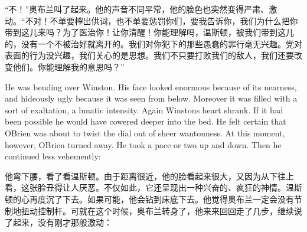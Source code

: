 \begin{paracol}{2}
\switchcolumn

``不！''奥布兰叫了起来。他的声音不同平常，他的脸色也突然变得严肃、激动。``不对！不单要榨出供词，也不单要惩罚你们，要我告诉你，我们为什么把你带到这儿来吗？为了医治你！让你清醒！你能理解吗，温斯顿，被我们带到这儿的，没有一个不被治好就离开的。我们对你犯下的那些愚蠢的罪行毫无兴趣。党对表面的行为没兴趣，我们关心的是思想。我们不只要打败我们的敌人，我们还要改变他们。你能理解我的意思吗？''

\switchcolumn*

He was bending over Winston. His face looked enormous because of its
nearness, and hideously ugly because it was seen from below. Moreover it
was filled with a sort of exaltation, a lunatic intensity. Again
Winston\textquotesingle s heart shrank. If it had been possible he would
have cowered deeper into the bed. He felt certain that
O\textquotesingle Brien was about to twist the dial out of sheer
wantonness. At this moment, however, O\textquotesingle Brien turned
away. He took a pace or two up and down. Then he continued less
vehemently:

\switchcolumn

他弯下腰，看了看温斯顿。由于距离很近，他的脸看起来很大，又因为从下往上看，这张脸丑得让人厌恶。不仅如此，它还呈现出一种兴奋的、疯狂的神情。温斯顿的心再度沉了下去。如果可能，他会钻到床底下去。他觉得奥布兰一定会没有节制地扭动控制杆。可就在这个时候，奥布兰转身了，他来来回回走了几步，继续说了起来，没有刚才那般激动：

\switchcolumn*


\end{paracol}
